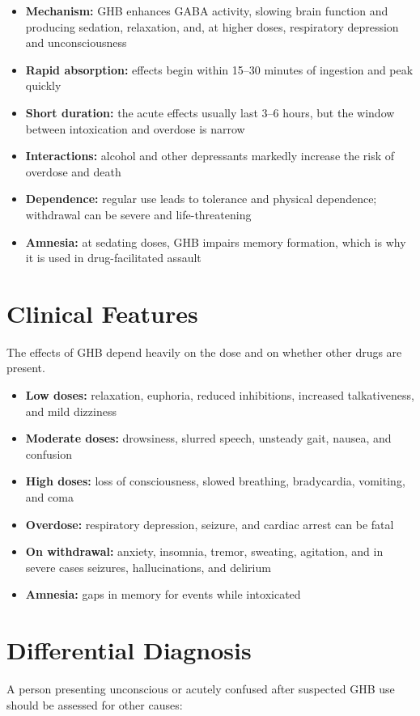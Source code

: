 \begin{itemize}
    \item \textbf{Mechanism:} GHB enhances GABA activity, slowing brain function and producing sedation, relaxation, and, at higher doses, respiratory depression and unconsciousness
    \item \textbf{Rapid absorption:} effects begin within 15--30 minutes of ingestion and peak quickly
    \item \textbf{Short duration:} the acute effects usually last 3--6 hours, but the window between intoxication and overdose is narrow
    \item \textbf{Interactions:} alcohol and other depressants markedly increase the risk of overdose and death
    \item \textbf{Dependence:} regular use leads to tolerance and physical dependence; withdrawal can be severe and life-threatening
    \item \textbf{Amnesia:} at sedating doses, GHB impairs memory formation, which is why it is used in drug-facilitated assault
\end{itemize}

\section*{Clinical Features}
The effects of GHB depend heavily on the dose and on whether other drugs are present.

\begin{itemize}
    \item \textbf{Low doses:} relaxation, euphoria, reduced inhibitions, increased talkativeness, and mild dizziness
    \item \textbf{Moderate doses:} drowsiness, slurred speech, unsteady gait, nausea, and confusion
    \item \textbf{High doses:} loss of consciousness, slowed breathing, bradycardia, vomiting, and coma
    \item \textbf{Overdose:} respiratory depression, seizure, and cardiac arrest can be fatal
    \item \textbf{On withdrawal:} anxiety, insomnia, tremor, sweating, agitation, and in severe cases seizures, hallucinations, and delirium
    \item \textbf{Amnesia:} gaps in memory for events while intoxicated
\end{itemize}

\section*{Differential Diagnosis}
A person presenting unconscious or acutely confused after suspected GHB use should be assessed for other causes:

